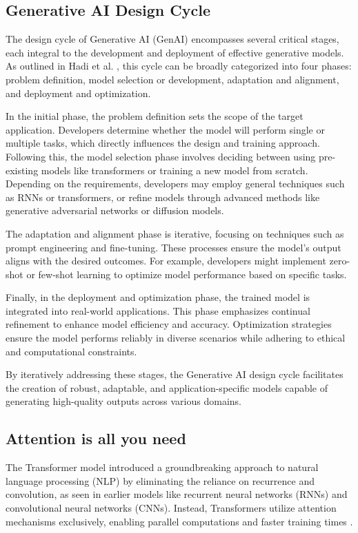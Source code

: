 \subsection{Generative AI Design Cycle}
The design cycle of Generative AI (GenAI) encompasses several critical stages, each integral to the development and deployment of effective generative models. As outlined in Hadi et al. \cite{11}, this cycle can be broadly categorized into four phases: problem definition, model selection or development, adaptation and alignment, and deployment and optimization.

In the initial phase, the problem definition sets the scope of the target application. Developers determine whether the model will perform single or multiple tasks, which directly influences the design and training approach. Following this, the model selection phase involves deciding between using pre-existing models like transformers or training a new model from scratch. Depending on the requirements, developers may employ general techniques such as RNNs or transformers, or refine models through advanced methods like generative adversarial networks or diffusion models.

The adaptation and alignment phase is iterative, focusing on techniques such as prompt engineering and fine-tuning. These processes ensure the model's output aligns with the desired outcomes. For example, developers might implement zero-shot or few-shot learning to optimize model performance based on specific tasks.

Finally, in the deployment and optimization phase, the trained model is integrated into real-world applications. This phase emphasizes continual refinement to enhance model efficiency and accuracy. Optimization strategies ensure the model performs reliably in diverse scenarios while adhering to ethical and computational constraints.

By iteratively addressing these stages, the Generative AI design cycle facilitates the creation of robust, adaptable, and application-specific models capable of generating high-quality outputs across various domains.
\subsection{Attention is all you need}
The Transformer model introduced a groundbreaking approach to natural language processing (NLP) by eliminating the reliance on recurrence and convolution, as seen in earlier models like recurrent neural networks (RNNs) and convolutional neural networks (CNNs). Instead, Transformers utilize attention mechanisms exclusively, enabling parallel computations and faster training times \cite{11}.


